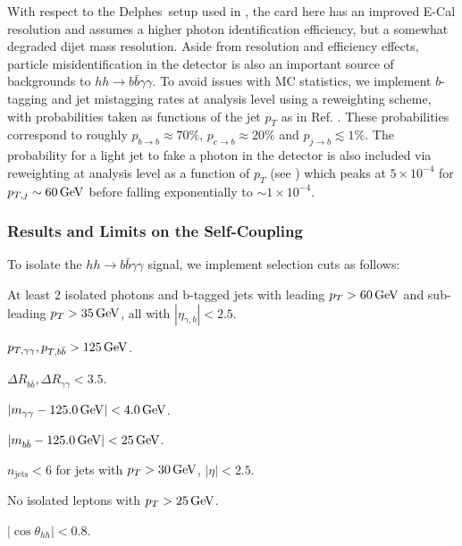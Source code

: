 With respect to the {\sc\small Delphes}\ setup used in \cite{Homiller:2018xxx}, the card here has an improved E-Cal resolution and assumes a higher photon identification efficiency, but a somewhat degraded dijet mass resolution. Aside from resolution and efficiency effects, particle misidentification in the detector is also an important source of backgrounds to $hh\rightarrow b\bar{b}\gamma\gamma$. To avoid issues with MC statistics, we implement $b$-tagging and jet mistagging rates at analysis level using a reweighting scheme, with probabilities taken as functions of the jet $p_T$ as in Ref. \cite{Homiller:2018xxx}. These probabilities correspond to roughly $p_{b\rightarrow b} \approx 70\%$, $p_{c\rightarrow b} \approx 20\%$ and $p_{j\rightarrow b} \lesssim 1\%$. The probability for a light jet to fake a photon in the detector is also included via reweighting at analysis level as a function of $p_T$ (see \cite{Homiller:2018xxx}) which peaks at $5\times 10^{-4}$ for $p_{T,j} \sim 60\, {\rm GeV}$ before falling exponentially to $\sim 1\times 10^{-4}$.


\subsubsection{Results and Limits on the Self-Coupling}

To isolate the $hh \rightarrow b\bar{b}\gamma\gamma$ signal, we implement selection cuts as follows:
\begin{itemize}
\setlength\itemsep{0.25em}
  \item At least 2 isolated photons and b-tagged jets with leading $p_T > 60\, {\rm GeV}$ and sub-leading $p_T > 35\, {\rm GeV}$, all with $|\eta_{\gamma,b}| < 2.5$.
  
\begin{minipage}{0.49\textwidth}
  \item $p_{T,\gamma\gamma}, p_{T,b\bar{b}} > 125\, {\rm GeV}$.
  \item $\Delta R_{b\bar{b}}, \Delta R_{\gamma\gamma} < 3.5.$
  \item $|m_{\gamma\gamma} - 125.0\, {\rm GeV}| < 4.0\, {\rm GeV}$.
  \item $|m_{b\bar{b}} - 125.0\, {\rm GeV}| < 25\, {\rm GeV}$.
\end{minipage}
\begin{minipage}{0.49\textwidth}
  \item $n_{\text{jets}} < 6$ for jets with $p_T > 30\, {\rm GeV}$, $|\eta| < 2.5$.
  \item No isolated leptons with $p_T > 25\, {\rm GeV}$.
  \item $|\cos\theta_{hh}| < 0.8$.
\end{minipage}
\end{itemize}

